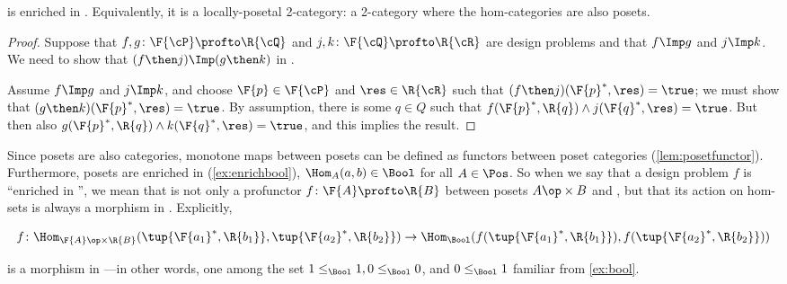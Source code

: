 \begin{proposition}
    \label{prop:DP_loc_pos}
    \DP is enriched in \Pos.
    Equivalently, it is a locally-posetal 2-category: a 2-category where the hom-categories are also posets.
\end{proposition}
\begin{proof}
    Suppose that $f,g\colon \F{\cP} \profto \R{\cQ}$ and $j,k\colon \F{\cQ} \profto \R{\cR}$ are design problems and that $f\Imp g$ and $j\Imp k$.
    We need to show that $(f\then j)\Imp(g\then k)$ in \DP.
    \begin{center}
    \end{center}
    Assume $f\Imp g$ and $j\Imp k$, and choose $\F{p}\in\F{\cP} $ and $\res\in\R{\cR}$ such that $(f\then j)(\F{p}^*,\res)=\true$; we must show that $(g \then k)(\F{p}^*,\res)=\true$.
    By assumption, there is some $q\in Q$ such that $f(\F{p}^*,\R{q})\wedge j(\F{q}^*,\res)=\true$.
    But then also $g(\F{p}^*,\R{q})\wedge k(\F{q}^*,\res)=\true$, and this implies the result.
\end{proof}

Since posets are also categories, monotone maps between posets can be defined as functors between poset categories (\cref{lem:posetfunctor}).
Furthermore, posets are enriched in \Bool (\cref{ex:enrichbool}), \ie  $\Hom_A(a,b) \in \Bool$ for all $A \in \Pos$.
So when we say that a design problem $f$ is ``enriched in \Bool'', we mean that is not only a profunctor $f \colon \F{A} \profto \R{B}$ between posets $A\op \times B$ and \Bool, but that its action on hom-sets is always a morphism in \Bool.
Explicitly,
\begin{widepar}
    \begin{equation*}
        f \colon \Hom_{\F{A}\op \times \R{B}}(\tup{\F{a_1}^*,\R{b_1}}, \tup{\F{a_2}^*,\R{b_2}}) \to \Hom_\Bool(f(\tup{\F{a_1}^*,\R{b_1}}), f(\tup{\F{a_2}^*,\R{b_2}}))
    \end{equation*}
\end{widepar}
is a morphism in \Bool---in other words, one among the set $1 \leq_\Bool 1, 0 \leq_\Bool 0$, and $0 \leq_\Bool 1$ familiar from \cref{ex:bool}.


